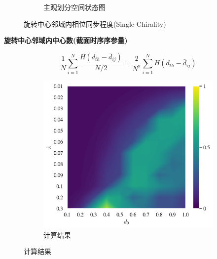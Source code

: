 \documentclass{article}
\begin{document}
\begin{figure}[H]
\begin{subfigure}[b]{0.49\textwidth}
		\vspace{-1cm}
		\caption{主观划分空间状态图}
	\end{subfigure}
	\vspace{-0.5cm}
	\caption{旋转中心邻域内相位同步程度(Single Chirality)}
	\label{fig:fig234c.5.2}
\end{figure}


\noindent\textbf{旋转中心邻域内中心数(截面时序序参量)}

$$
\frac{1}{N}\sum_{i=1}^N{\frac{H\left( d_{th}-\bar{d}_{ij} \right)}{N/2}}=\frac{2}{N^2}\sum_{i=1}^N{H\left( d_{th}-\bar{d}_{ij} \right)}
$$

\vspace{-0.5cm}
\begin{figure}[H]
	\centering
	\begin{subfigure}[b]{0.49\textwidth}
		\includegraphics[width=\textwidth]{./figs/nearbyNumsRing.png}
		\vspace{-1cm}
		\caption{计算结果}
		

\end{subfigure}
\end{figure}
\end{document}
